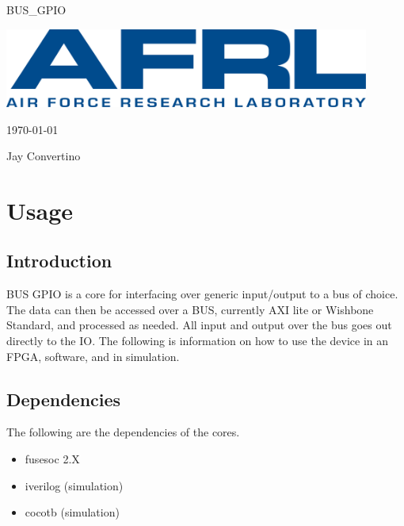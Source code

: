 \begin{titlepage}
  \begin{center}

  {\Huge BUS\_GPIO}

  \vspace{25mm}

  \includegraphics[width=0.90\textwidth,height=\textheight,keepaspectratio]{img/AFRL.png}

  \vspace{25mm}

  \today

  \vspace{15mm}

  {\Large Jay Convertino}

  \end{center}
\end{titlepage}

\tableofcontents

\newpage

\section{Usage}

\subsection{Introduction}

\par
BUS GPIO is a core for interfacing over generic input/output to a bus of choice. The data can then be accessed over a BUS,
currently AXI lite or Wishbone Standard, and processed as needed. All input and output over the bus goes out directly to the IO.
The following is information on how to use the device in an FPGA, software, and in simulation.

\subsection{Dependencies}

\par
The following are the dependencies of the cores.

\begin{itemize}
  \item fusesoc 2.X
  \item iverilog (simulation)
  \item cocotb (simulation)
\end{itemize}

